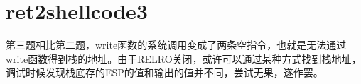 \documentclass{article}
\begin{document}
\section{ret2shellcode3}
    第三题相比第二题，write函数的系统调用变成了两条空指令，也就是无法通过write函数得到栈的地址。由于RELRO关闭，或许可以通过某种方式找到栈地址，调试时候发现栈底存的ESP的值和输出的值并不同，尝试无果，遂作罢。
   
   
   
   
   
   
   
   
   
   
   
   
   
   
   
   
   
   
   
   
   
   
   
   
   
 
\end{document}
